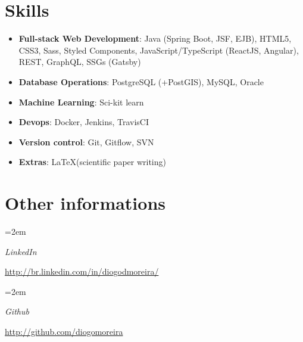 \documentclass[a4paper,10pt]{article}
\newlength{\spacebox}
\newcommand{\sepspace}{\vspace*{0.5em}}
\newcommand{\NewPart}[1]{ \section*{\large {#1}}}
\newcommand{\PersonalEntry}[2]{
		\noindent\hangindent=1em\hangafter=0 		%
		\parbox{\spacebox}{							%
		\textit{#1}}								%
		\hspace{0em} #2 \par}						%
\newcommand{\SkillsEntry}[2]{						%
		\noindent\hangindent=2em\hangafter=0 		%
		\parbox{\spacebox}{							%
		\textit{#1}}								%
		\hspace{1.5em} #2 \par}						%
\begin{document}

\NewPart{Skills}{}

\begin{itemize}
    \linespread{1}
    \item \textbf{Full-stack Web Development}: Java (Spring Boot, JSF, EJB), HTML5, CSS3, Sass, Styled Components, JavaScript/TypeScript (ReactJS, Angular), REST, GraphQL, SSGs (Gatsby)
    \item \textbf{Database Operations}: PostgreSQL (+PostGIS), MySQL, Oracle
    \item \textbf{Machine Learning}: Sci-kit learn
    \item \textbf{Devops}: Docker, Jenkins, TravisCI
    \item \textbf{Version control}: Git, Gitflow, SVN
    \item \textbf{Extras}: \LaTeX (scientific paper writing)
\end{itemize}


\sepspace


\sepspace





\NewPart{Other informations}{}
\SkillsEntry{LinkedIn}{\url{http://br.linkedin.com/in/diogodmoreira/}}
\SkillsEntry{Github}{\url{http://github.com/diogomoreira}}
\end{document}
